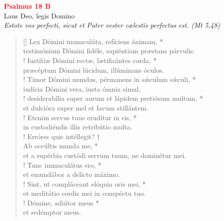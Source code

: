 \begin{center}
 \textcolor{red}{\large \bf Psalmus 18 B}\\
Laus Deo, legis Domino\\
\textit{\small Estote vos perfecti, sicut et Pater vester cælestis perfectus est. (Mt 5,48)}
\end{center}
\begin{verse}[\versewidth]
Lex Dómini immaculáta, refíciens ánimam, *\\
testimónium Dómini fidéle, sapiéntiam præstans párvulis.\\!
\vin Iustítiæ Dómini rectæ, lætificántes corda, *\\
\vin præcéptum Dómini lúcidum, illúminans óculos.\\!
Timor Dómini mundus, pérmanens in s\'{æ}culum s\'{æ}culi, *\\
iudícia Dómini vera, iusta ómnia simul,\\!
\vin desiderabília super \verselinebreak aurum et lápidem pretiósum multum, *\\
\vin et dulcióra super mel et favum stillántem.\\!
Etenim servus tuus erudítur in eis, *\\
in custodiéndis illis retribútio multa.\\!
\vin Erróres quis intéllegit? †\\
\vin Ab occúltis munda me, *\\
\vin et a supérbia custódi servum tuum, ne dominétur mei.\\!
Tunc immaculátus ero, *\\
et emundábor a delícto máximo.\\!
\vin Sint, ut compláceant elóquia oris mei, *\\
\vin et meditátio cordis mei in conspéctu tuo.\\!
Dómine, adiútor meus *\\
et redémptor meus.\\
\end{verse}
\vspace{1cm}


